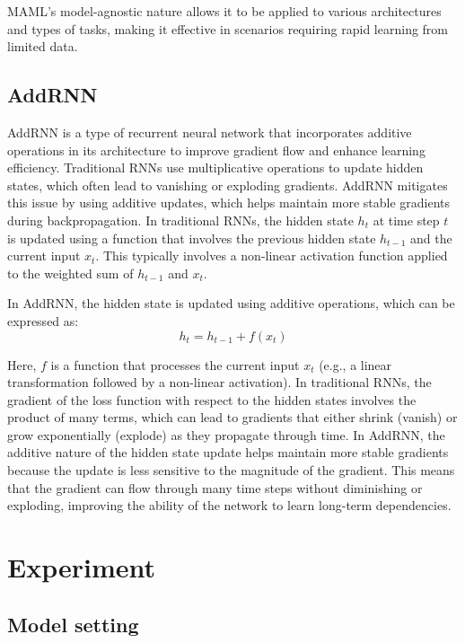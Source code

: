 \documentclass{ieeeojies}
\begin{document}
MAML's model-agnostic nature allows it to be applied to various architectures and types of tasks, making it effective in scenarios requiring rapid learning from limited data.
\subsection{AddRNN}
AddRNN is a type of recurrent neural network that incorporates additive operations in its architecture to improve gradient flow and enhance learning efficiency. Traditional RNNs use multiplicative operations to update hidden states, which often lead to vanishing or exploding gradients. AddRNN mitigates this issue by using additive updates, which helps maintain more stable gradients during backpropagation.
In traditional RNNs, the hidden state \( h_t \) at time step \( t \) is updated using a function that involves the previous hidden state \( h_{t-1} \) and the current input \( x_t \). This typically involves a non-linear activation function applied to the weighted sum of \( h_{t-1} \) and \( x_t \).

In AddRNN, the hidden state is updated using additive operations, which can be expressed as:
\begin{equation}
h_t = h_{t-1} + f(x_t)
\end{equation}

Here, \( f \) is a function that processes the current input \( x_t \) (e.g., a linear transformation followed by a non-linear activation).
In traditional RNNs, the gradient of the loss function with respect to the hidden states involves the product of many terms, which can lead to gradients that either shrink (vanish) or grow exponentially (explode) as they propagate through time.
In AddRNN, the additive nature of the hidden state update helps maintain more stable gradients because the update is less sensitive to the magnitude of the gradient. This means that the gradient can flow through many time steps without diminishing or exploding, improving the ability of the network to learn long-term dependencies.

\section{Experiment}
\subsection{Model setting}
\end{document}
